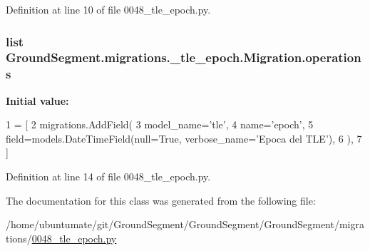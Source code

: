 Definition at line 10 of file 0048\+\_\+tle\+\_\+epoch.\+py.

\hypertarget{class_ground_segment_1_1migrations_1_10048__tle__epoch_1_1_migration_a63c8dd3b77aa91a92f33c29709e4d0d1}{}
\subsubsection[{operations}]{\setlength{\rightskip}{0pt plus 5cm}list Ground\+Segment.\+migrations.\+\_\+tle\+\_\+epoch.\+Migration.\+operations\hspace{0.3cm}{\ttfamily [static]}}\label{class_ground_segment_1_1migrations_1_10048__tle__epoch_1_1_migration_a63c8dd3b77aa91a92f33c29709e4d0d1}
{\bfseries Initial value\+:}
\begin{DoxyCode}
1 = [
2         migrations.AddField(
3             model\_name=\textcolor{stringliteral}{'tle'},
4             name=\textcolor{stringliteral}{'epoch'},
5             field=models.DateTimeField(null=\textcolor{keyword}{True}, verbose\_name=\textcolor{stringliteral}{'Epoca del TLE'}),
6         ),
7     ]
\end{DoxyCode}


Definition at line 14 of file 0048\+\_\+tle\+\_\+epoch.\+py.



The documentation for this class was generated from the following file\+:\begin{DoxyCompactItemize}
\item 
/home/ubuntumate/git/\+Ground\+Segment/\+Ground\+Segment/\+Ground\+Segment/migrations/\hyperlink{0048__tle__epoch_8py}{0048\+\_\+tle\+\_\+epoch.\+py}\end{DoxyCompactItemize}
